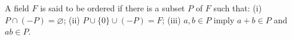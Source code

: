 A field $F$ is said to be ordered if there is a subset $P$ of $F$ such that:
(i) $P \cap (-P) = \varnothing$;
(ii) $P \cup \{0\} \cup (-P) = F$;
(iii) $a, b \in P$ imply $a + b \in P$ and $ab \in P$.